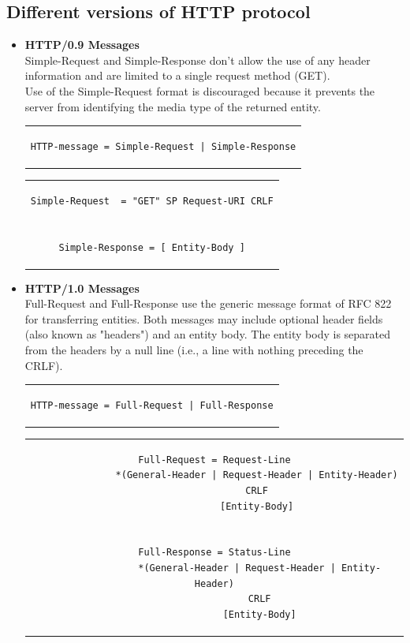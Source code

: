 \subsection{Different versions of HTTP protocol}
\begin{itemize}
\item{\textbf{HTTP/0.9 Messages}\\
Simple-Request and Simple-Response don't allow the use of any header information and are limited to a single request method (GET).\\
Use of the Simple-Request format is discouraged because it prevents the server from identifying the media type of the returned entity.
\begin{center}
\begin{tabular}{c}
\begin{lstlisting}[linewidth=240pt, basicstyle=\footnotesize\sffamily,]
HTTP-message = Simple-Request | Simple-Response
\end{lstlisting}
\end{tabular}
\end{center}
\begin{center}
\begin{tabular}{c}
\begin{lstlisting}[linewidth=230pt, basicstyle=\footnotesize\sffamily,]
Simple-Request  = "GET" SP Request-URI CRLF


Simple-Response = [ Entity-Body ]
\end{lstlisting}
\end{tabular}
\end{center}
}
\item{\textbf{HTTP/1.0 Messages}\\
Full-Request and Full-Response use the generic message format of RFC 822 for transferring entities. Both messages may include optional header fields (also known as "headers") and an entity body. The entity body is separated from the headers by a null line (i.e., a line with nothing preceding the CRLF).
\begin{center}
\begin{tabular}{c}
\begin{lstlisting}[linewidth=230pt, basicstyle=\footnotesize\sffamily,]
HTTP-message = Full-Request | Full-Response
\end{lstlisting}
\end{tabular}
\end{center}
\begin{center}
\begin{tabular}{c}
\begin{lstlisting}[linewidth=340pt, basicstyle=\footnotesize\sffamily,]
Full-Request = Request-Line
               *(General-Header | Request-Header | Entity-Header)
               CRLF
               [Entity-Body]


Full-Response = Status-Line
                *(General-Header | Request-Header | Entity-Header)
                CRLF
                [Entity-Body]
\end{lstlisting}
\end{tabular}
\end{center}
}
\end{itemize}

